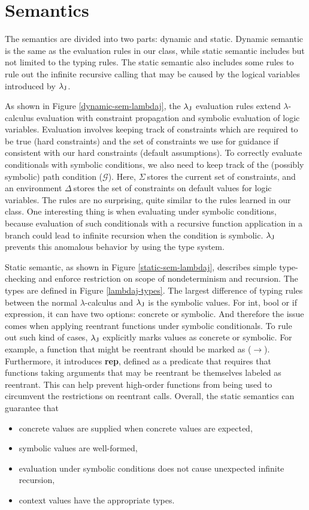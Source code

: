 \section{Semantics}
\label{semantics}

The semantics are divided into two parts: dynamic and static. Dynamic semantic is the same as the evaluation rules in our class, while static semantic includes but not limited to the typing rules. The static semantic also includes some rules to rule out the infinite recursive calling that may be caused by the logical variables introduced by ${\lambda_{\text{J}}}$.

As shown in Figure \ref{dynamic-sem-lambdaj}, the ${\lambda_{\text{J}}}$ evaluation rules extend {\ensuremath{\lambda}}-calculus evaluation with constraint propagation and symbolic evaluation of logic variables. Evaluation involves keeping track of constraints which are required to be true (hard constraints) and the set of constraints we use for guidance if consistent with our hard constraints (default assumptions). To correctly evaluate conditionals with symbolic conditions, we also need to keep track of the (possibly symbolic) path condition ($\mathscr{G}$). Here, $\Sigma~$stores the current set of constraints, and an environment $\Delta~$stores the set of constraints on default values for logic variables. The rules are no surprising, quite similar to the rules learned in our class. One interesting thing is when evaluating under symbolic conditions, because evaluation of such conditionals with a recursive function application in a branch could lead to infinite recursion when the condition is symbolic. ${\lambda_{\text{J}}}$ prevents this anomalous behavior by using the type system.

Static semantic, as shown in Figure \ref{static-sem-lambdaj}, describes simple type-checking and enforce restriction on scope of nondeterminism and recursion. The types are defined in Figure \ref{lambdaj-types}. The largest difference of typing rules between the normal {\ensuremath{\lambda}}-calculus and ${\lambda_{\text{J}}}$ is the symbolic values. For int, bool or if expression, it can have two options: concrete or symbolic. And therefore the issue comes when applying reentrant functions under symbolic conditionals. To rule out such kind of cases, ${\lambda_{\text{J}}}$ explicitly marks values as concrete or symbolic. For example, a function that might be reentrant should be marked as ($\longrightarrow$). Furthermore, it introduces \textbf{rep}, defined as a predicate that requires that functions taking arguments that may be reentrant be themselves labeled as reentrant. This can help prevent high-order functions from being used to circumvent the restrictions on reentrant calls. Overall, the static semantics can guarantee that
\begin{itemize}
\item concrete values are supplied when concrete values are expected,
\item symbolic values are well-formed,
\item evaluation under symbolic conditions does not cause unexpected infinite recursion,
\item context values have the appropriate types.
\end{itemize}


